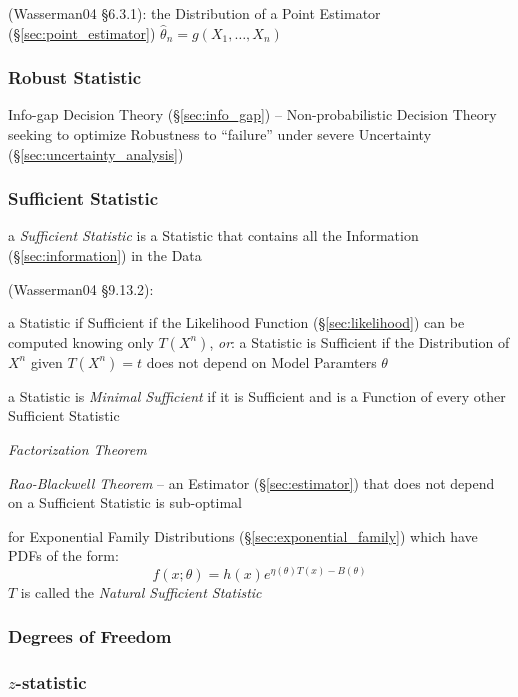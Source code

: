 (Wasserman04 \S6.3.1):
the Distribution of a Point Estimator (\S\ref{sec:point_estimator})
$\hat{\theta}_n = g(X_1,\ldots,X_n)$



\subsubsection{Robust Statistic}\label{sec:robust_statistic}

\fist Info-gap Decision Theory (\S\ref{sec:info_gap}) -- Non-probabilistic
Decision Theory seeking to optimize Robustness to ``failure'' under severe
Uncertainty (\S\ref{sec:uncertainty_analysis})



\subsubsection{Sufficient Statistic}\label{sec:sufficient_statistic}

a \emph{Sufficient Statistic} is a Statistic that contains all the
Information (\S\ref{sec:information}) in the Data

(Wasserman04 \S9.13.2):

a Statistic if Sufficient if the Likelihood Function (\S\ref{sec:likelihood})
can be computed knowing only $T(X^n)$,
\emph{or}: a Statistic is Sufficient if the Distribution of $X^n$ given
$T(X^n) = t$ does not depend on Model Paramters $\theta$

a Statistic is \emph{Minimal Sufficient} if it is Sufficient and is a Function
of every other Sufficient Statistic

\emph{Factorization Theorem}

\emph{Rao-Blackwell Theorem} -- an Estimator (\S\ref{sec:estimator}) that does
not depend on a Sufficient Statistic is sub-optimal

for Exponential Family Distributions (\S\ref{sec:exponential_family}) which have
PDFs of the form:
\[
  f(x; \theta) = h(x) e^{\eta(\theta)T(x) - B(\theta)}
\]
$T$ is called the \emph{Natural Sufficient Statistic}



\subsubsection{Degrees of Freedom}\label{sec:statistical_freedom}

\subsubsection{$z$-statistic}\label{sec:z_statistic}

